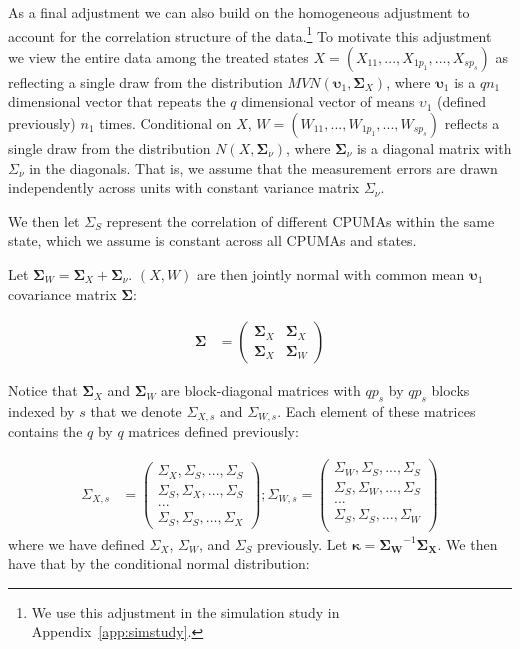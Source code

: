 As a final adjustment we can also build on the homogeneous adjustment to account for the correlation structure of the data.\footnote{We use this adjustment in the simulation study in Appendix~\ref{app:simstudy}.} To motivate this adjustment we view the entire data among the treated states $X = (X_{11}, ..., X_{1p_1}, ..., X_{sp_s})$ as reflecting a single draw from the distribution $MVN(\boldsymbol{\upsilon}_1, \mathbf{\Sigma}_X)$, where $\boldsymbol{\upsilon}_1$ is a $qn_1$ dimensional vector that repeats the $q$ dimensional vector of means $\upsilon_1$ (defined previously) $n_1$ times. Conditional on $X$, $W = (W_{11}, ..., W_{1p_1}, ..., W_{sp_s})$ reflects a single draw from the distribution $N(X, \boldsymbol{\Sigma}_{\nu})$, where $\boldsymbol{\Sigma}_{\nu}$ is a diagonal matrix with $\Sigma_{\nu}$ in the diagonals. That is, we assume that the measurement errors are drawn independently across units with constant variance matrix $\Sigma_{\nu}$.

We then let $\Sigma_S$ represent the correlation of different CPUMAs within the same state, which we assume is constant across all CPUMAs and states. 

Let $\boldsymbol{\Sigma}_W = \boldsymbol{\Sigma}_X + \boldsymbol{\Sigma}_{\nu}$. $(X, W)$ are then jointly normal with common mean $\boldsymbol{\upsilon}_1$ covariance matrix $\boldsymbol{\Sigma}$: 

\begin{align*}
\boldsymbol{\Sigma} &= \begin{pmatrix}
\mathbf{\Sigma}_X & \mathbf{\Sigma}_X \\
\mathbf{\Sigma}_X & \mathbf{\Sigma}_W
\end{pmatrix} 
\end{align*}

Notice that $\mathbf{\Sigma}_X$ and $\mathbf{\Sigma}_W$ are block-diagonal matrices with $qp_s$ by $qp_s$ blocks indexed by $s$ that we denote $\Sigma_{X, s}$ and $\Sigma_{W, s}$. Each element of these matrices contains the $q$ by $q$ matrices defined previously: 

\begin{align*}
\Sigma_{X, s} &= \begin{pmatrix}
\Sigma_{X}, \Sigma_{S}, ..., \Sigma_{S} \\
\Sigma_{S}, \Sigma_{X}, ..., \Sigma_{S} \\
... \\
\Sigma_{S}, \Sigma_{S}, ..., \Sigma_{X}
\end{pmatrix};
\Sigma_{W, s} = \begin{pmatrix}
\Sigma_{W}, \Sigma_{S}, ..., \Sigma_{S} \\
\Sigma_{S}, \Sigma_{W}, ..., \Sigma_{S} \\
... \\
\Sigma_{S}, \Sigma_{S}, ..., \Sigma_{W} \\
\end{pmatrix}
\end{align*}
%
where we have defined $\Sigma_{X}$, $\Sigma_{W}$, and $\Sigma_{S}$ previously. 
Let $\boldsymbol{\kappa} = \mathbf{\Sigma_W}^{-1}\mathbf{\Sigma_X}$. We then have that by the conditional normal distribution:

